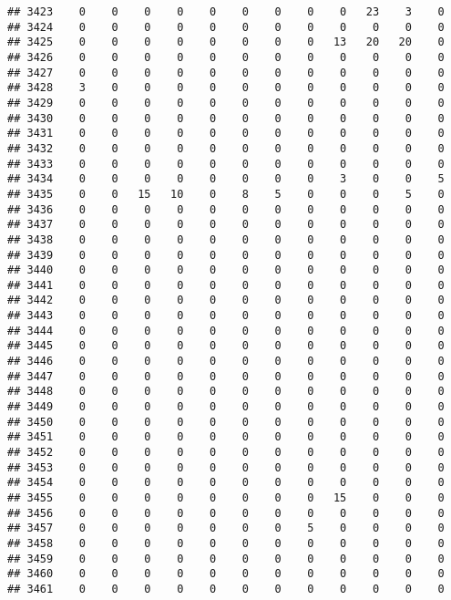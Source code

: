 \documentclass[]{article}
\begin{document}
\begin{verbatim}
## 3423    0    0    0    0    0    0    0    0    0   23    3    0
## 3424    0    0    0    0    0    0    0    0    0    0    0    0
## 3425    0    0    0    0    0    0    0    0   13   20   20    0
## 3426    0    0    0    0    0    0    0    0    0    0    0    0
## 3427    0    0    0    0    0    0    0    0    0    0    0    0
## 3428    3    0    0    0    0    0    0    0    0    0    0    0
## 3429    0    0    0    0    0    0    0    0    0    0    0    0
## 3430    0    0    0    0    0    0    0    0    0    0    0    0
## 3431    0    0    0    0    0    0    0    0    0    0    0    0
## 3432    0    0    0    0    0    0    0    0    0    0    0    0
## 3433    0    0    0    0    0    0    0    0    0    0    0    0
## 3434    0    0    0    0    0    0    0    0    3    0    0    5
## 3435    0    0   15   10    0    8    5    0    0    0    5    0
## 3436    0    0    0    0    0    0    0    0    0    0    0    0
## 3437    0    0    0    0    0    0    0    0    0    0    0    0
## 3438    0    0    0    0    0    0    0    0    0    0    0    0
## 3439    0    0    0    0    0    0    0    0    0    0    0    0
## 3440    0    0    0    0    0    0    0    0    0    0    0    0
## 3441    0    0    0    0    0    0    0    0    0    0    0    0
## 3442    0    0    0    0    0    0    0    0    0    0    0    0
## 3443    0    0    0    0    0    0    0    0    0    0    0    0
## 3444    0    0    0    0    0    0    0    0    0    0    0    0
## 3445    0    0    0    0    0    0    0    0    0    0    0    0
## 3446    0    0    0    0    0    0    0    0    0    0    0    0
## 3447    0    0    0    0    0    0    0    0    0    0    0    0
## 3448    0    0    0    0    0    0    0    0    0    0    0    0
## 3449    0    0    0    0    0    0    0    0    0    0    0    0
## 3450    0    0    0    0    0    0    0    0    0    0    0    0
## 3451    0    0    0    0    0    0    0    0    0    0    0    0
## 3452    0    0    0    0    0    0    0    0    0    0    0    0
## 3453    0    0    0    0    0    0    0    0    0    0    0    0
## 3454    0    0    0    0    0    0    0    0    0    0    0    0
## 3455    0    0    0    0    0    0    0    0   15    0    0    0
## 3456    0    0    0    0    0    0    0    0    0    0    0    0
## 3457    0    0    0    0    0    0    0    5    0    0    0    0
## 3458    0    0    0    0    0    0    0    0    0    0    0    0
## 3459    0    0    0    0    0    0    0    0    0    0    0    0
## 3460    0    0    0    0    0    0    0    0    0    0    0    0
## 3461    0    0    0    0    0    0    0    0    0    0    0    0

\end{verbatim}
\end{document}
